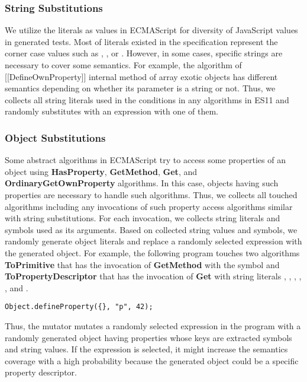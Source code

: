\subsubsection{String Substitutions}
We utilize the literals as values in ECMAScript for diversity of JavaScript
values in generated tests.  Most of literals existed in the specification
represent the corner case values such as , , or
.  However, in some cases, specific strings are necessary to cover
some semantics.  For example, the algorithm of [[DefineOwnProperty]] internal
method of array exotic objects has different semantics depending on whether its
parameter  is a string  or not.  Thus, we collects all
string literals used in the conditions in any algorithms in ES11 and randomly
substitutes with an expression with one of them.


\subsubsection{Object Substitutions}
Some abstract algorithms in ECMAScript try to access some properties of an
object using \textbf{HasProperty}, \textbf{GetMethod}, \textbf{Get}, and
\textbf{OrdinaryGetOwnProperty} algorithms.  In this case, objects having such
properties are necessary to handle such algorithms.  Thus, we collects all
touched algorithms including any invocations of such property access algorithms
similar with string substitutions.  For each invocation, we collects string
literals and symbols used as its arguments.  Based on collected string values
and symbols, we randomly generate object literals and replace a randomly
selected expression with the generated object.  For example, the following
program touches two algorithms \textbf{ToPrimitive} that has the invocation of
\textbf{GetMethod} with the symbol  and
\textbf{ToPropertyDescriptor} that has the invocation of \textbf{Get} with
string literals , , , ,
, and .
\begin{lstlisting}[style=myJSstyle]
Object.defineProperty({}, "p", 42);
\end{lstlisting}
Thus, the mutator mutates a randomly selected expression in the program with a
randomly generated object having properties whose keys are extracted symbols and
string values.  If the expression  is selected, it might increase the
semantics coverage with a high probability because the generated object could be
a specific property descriptor.


